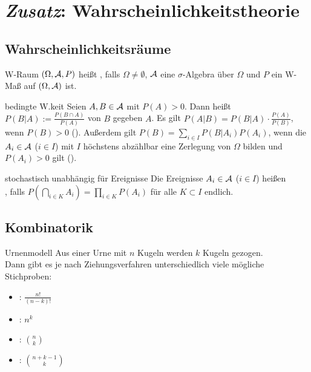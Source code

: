\section{%
    \emph{Zusatz}: Wahrscheinlichkeitstheorie%
}

\subsection{%
    Wahrscheinlichkeitsräume%
}

\begin{Def}{W-Raum}
    $(\Omega, \mathcal{A}, P)$ heißt , falls
    $\Omega \not= \emptyset$,
    $\mathcal{A}$ eine $\sigma$-Algebra über $\Omega$ und
    $P$ ein W-Maß auf $(\Omega, \mathcal{A})$ ist.
\end{Def}

\begin{Def}{bedingte W.keit}
    Seien $A, B \in \mathcal{A}$ mit $P(A) > 0$.
    Dann heißt $P(B|A) := \frac{P(B \cap A)}{P(A)}$  von
    $B$ gegeben $A$.
    Es gilt $P(A|B) = P(B|A) \cdot \frac{P(A)}{P(B)}$, wenn $P(B) > 0$
    ().
    Außerdem gilt $P(B) = \sum_{i \in I} P(B|A_i) P(A_i)$, wenn die $A_i \in \mathcal{A}$ ($i \in I$) mit
    $I$ höchstens abzählbar eine Zerlegung von $\Omega$ bilden und $P(A_i) > 0$ gilt
    ().
\end{Def}

\begin{Def}{stochastisch unabhängig für Ereignisse}
    Die Ereignisse $A_i \in \mathcal{A}$ ($i \in I$) heißen\\
    ,
    falls $P(\bigcap_{i \in K} A_i) = \prod_{i \in K} P(A_i)$ für alle $K \subset I$ endlich.
\end{Def}

\subsection{%
    Kombinatorik%
}

\begin{Def}{Urnenmodell}
    Aus einer Urne mit $n$ Kugeln werden $k$ Kugeln gezogen.\\
    Dann gibt es je nach Ziehungsverfahren unterschiedlich viele mögliche Stichproben:
    \begin{itemize}
        \item
        :
        $\frac{n!}{(n - k)!}$

        \item
        :
        $n^k$

        \item
        :
        $\binom{n}{k}$

        \item
        :
        $\binom{n + k - 1}{k}$
    \end{itemize}
\end{Def}

